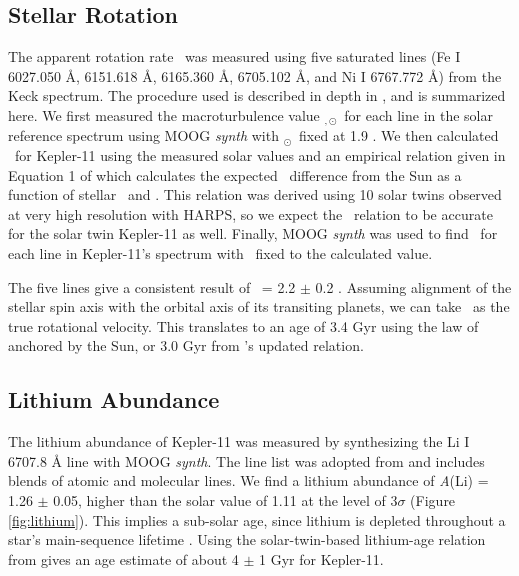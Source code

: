 \documentclass[oneside]{emulateapj}
\begin{document}
\subsection{Stellar Rotation}

The apparent rotation rate \vsini\ was measured using five saturated lines (Fe I 6027.050 \r{A}, 6151.618 \r{A}, 6165.360 \r{A}, 6705.102 \r{A}, and Ni I 6767.772 \r{A}) from the Keck spectrum. The procedure used is described in depth in \citet{dosSantos2016}, and is summarized here. We first measured the macroturbulence value \vmacro$_{,\odot}$\ for each line in the solar reference spectrum using MOOG \textit{synth} with \vsini$_{\odot}$\ fixed at 1.9 \kms. We then calculated \vmacro\ for Kepler-11 using the measured solar values and an empirical relation given in Equation 1 of \citet{dosSantos2016} which calculates the expected \vmacro\ difference from the Sun as a function of stellar \teff\ and \logg. This relation was derived using 10 solar twins observed at very high resolution with HARPS, so we expect the \vmacro\ relation to be accurate for the solar twin Kepler-11 as well. Finally, MOOG \textit{synth} was used to find \vsini\ for each line in Kepler-11's spectrum with \vmacro\ fixed to the calculated value.

The five lines give a consistent result of \vsini\ = 2.2 $\pm$ 0.2 \kms. Assuming alignment of the stellar spin axis with the orbital axis of its transiting planets, we can take \vsini\ as the true rotational velocity. This translates to an age of 3.4 Gyr using the law of \citet{Skumanich1972} anchored by the Sun, or 3.0 Gyr from \citet{dosSantos2016}'s updated relation.

\subsection{Lithium Abundance}
\label{s:lithium}

The lithium abundance of Kepler-11 was measured by synthesizing the Li I 6707.8 \r{A} line with MOOG \textit{synth}. The line list was adopted from \citet{Melendez2012} and includes blends of atomic and molecular lines. We find a lithium abundance of \textit{A}(Li) = 1.26 $\pm$ 0.05, higher than the solar value of 1.11 at the level of 3$\sigma$ (Figure \ref{fig:lithium}). This implies a sub-solar age, since lithium is depleted throughout a star's main-sequence lifetime \citep{Duncan1981}. Using the solar-twin-based lithium-age relation from \citet{Carlos2016} gives an age estimate of about 4 $\pm$ 1 Gyr for Kepler-11.
\end{document}
